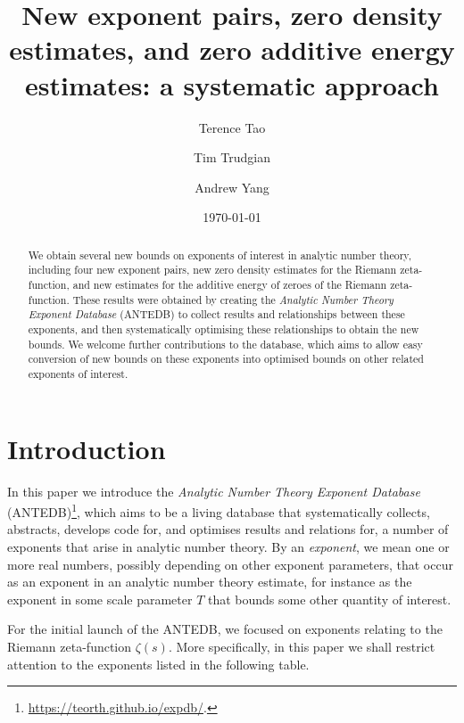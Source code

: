\documentclass[a4paper, 10pt]{amsart}
\title[Exponent pairs and zero density estimates]{New exponent pairs, zero density estimates, and zero additive energy estimates: a systematic approach}
\author[T. Tao]{Terence Tao}
\author[T. S. Trudgian]{Tim Trudgian}
\author[A. Yang]{Andrew Yang}
\begin{document}
\date\today
{}

\begin{abstract}
    We obtain several new bounds on exponents of interest in analytic number theory, including four new exponent pairs, new zero density estimates for the Riemann zeta-function, and new estimates for the additive energy of zeroes of the Riemann zeta-function.  These results were obtained by creating the \emph{Analytic Number Theory Exponent Database} (ANTEDB) to collect results and relationships between these exponents, and then systematically optimising these relationships to obtain the new bounds.  We welcome further contributions to the database, which aims to allow easy conversion of new bounds on these exponents into optimised bounds on other related exponents of interest.
    \end{abstract}
\maketitle
%
\section{Introduction}
%
In this paper we introduce the \emph{Analytic Number Theory Exponent Database} (ANTEDB)\footnote{\url{https://teorth.github.io/expdb/}.}, which aims to be a living database that systematically collects, abstracts, develops code for, and optimises results and relations for, a number of exponents that arise in analytic number theory.   By an \emph{exponent}, we mean one or more real numbers, possibly depending on other exponent parameters, that occur as an exponent in an analytic number theory estimate, for instance as the exponent in some scale parameter $T$ that bounds some other quantity of interest.

For the initial launch of the ANTEDB, we focused on exponents relating to the Riemann zeta-function $\zeta(s)$. More specifically, in this paper we shall restrict attention to the exponents listed in the following table.
\end{document}
